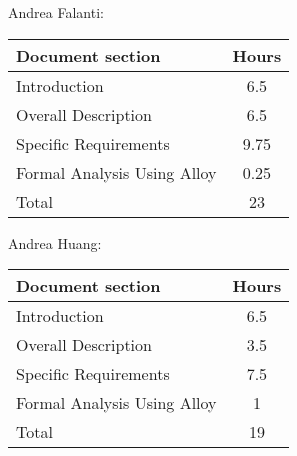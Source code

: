 Andrea Falanti:

\begin{tabular}{|l|c|}
    \hline
    Document section & Hours \\
    \hline
     Introduction & 6.5\\
     Overall Description & 6.5\\
     Specific Requirements & 9.75\\
     Formal Analysis Using Alloy & 0.25\\
     \hline
     Total & 23\\
     \hline
\end{tabular}
\vskip 0.3in

Andrea Huang:

\begin{tabular}{|l|c|}
    \hline
    Document section & Hours \\
    \hline
     Introduction &  6.5\\
     Overall Description & 3.5\\
     Specific Requirements & 7.5\\
     Formal Analysis Using Alloy & 1\\
     \hline
     Total & 19\\
     \hline
\end{tabular}